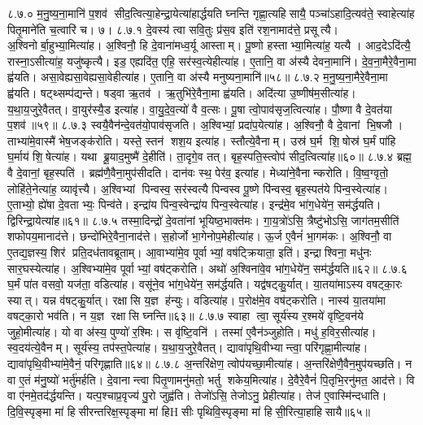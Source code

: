 ८.७.०
म॒नु॒ष्य॒ना॒मानि॑ प॒शव॑ सीद॒त्वित्या॒हेन्द्रा॒येत्या॑हार्द्धयति घ्नन्ति गृह्णा॒त्यहिसायै॒ पञ्चा॑ऽहादि॒त्यव॑ते॒ स्वाहेत्या॑ह पितृ॒माने॑ति च॒त्वारि॑ च। ७।
८.७.१
दे॒वस्य॑ त्वा सवि॒तुः प्र॑स॒व इति॑ रश॒नामाद॑त्ते॒ प्रसूत्यै। अ॒श्विनोर्बा॒हुभ्या॒मित्या॑ह। अ॒श्विनौ॒ हि दे॒वाना॑मध्व॒र्यू आस्ताम्। पू॒ष्णो हस्ताभ्या॒मित्या॑ह॒ यत्यै। आद॒देऽदि॑त्यै॒ रास्ना॒ऽसीत्या॑ह॒ यजु॑ष्कृत्यै। इड॒ एह्यदि॑त॒ एहि॒ सर॑स्व॒त्येहीत्या॑ह। ए॒तानि॒ वा अ॑स्यै देवना॒मानि॑। दे॒व॒ना॒मैरे॒वैना॒मा ह्व॑यति। असा॒वेह्यसा॒वेह्यसा॒वेहीत्या॑ह। ए॒तानि॒ वा अ॑स्यै मनुष्यना॒मानि॑॥५८॥
८.७.२
म॒नु॒ष्य॒ना॒मैरे॒वैना॒मा ह्व॑यति। षट्थ्सम्प॑द्यन्ते। षड्वा ऋ॒तव॑। ऋ॒तुभि॑रे॒वैना॒मा ह्व॑यति। अदि॑त्या उ॒ष्णीष॑म॒सीत्या॑ह। य॒था॒य॒जुरे॒वैतत्। वा॒युर॑स्यै॒ड इत्या॑ह। वा॒यु॒दे॒व॒त्यो॑ वै व॒त्सः। पू॒षा त्वो॒पाव॑सृज॒त्वित्या॑ह। पौ॒ष्णा वै दे॒वत॑या प॒शव॑॥५९॥
८.७.३
स्वयै॒वैन॑न्दे॒वत॑यो॒पाव॑सृजति। अ॒श्विभ्यां॒ प्रदा॑प॒येत्या॑ह। अ॒श्विनौ॒ वै दे॒वानां भि॒षजौ। ताभ्या॑मे॒वास्मै॑ भेष॒जङ्क॑रोति। यस्ते॒ स्तन॑ शश॒य इत्या॑ह। स्तौत्ये॒वैनाम्। उस्र॑ घ॒र्म शि॒षोस्र॑ घ॒र्मं पा॑हि घ॒र्माय॑ शि॒षेत्या॑ह। यथा ब्रू॒याद॒मुष्मै॑ दे॒हीति॑। ता॒दृगे॒व तत्। बृह॒स्पति॒स्त्वोप॑ सीद॒त्वित्या॑ह॥६०॥
८.७.४
ब्रह्म॒ वै दे॒वानां॒ बृह॒स्पति॑। ब्रह्म॑णै॒वैना॒मुप॑सीदति। दान॑वः स्थ॒ पेर॑व॒ इत्या॑ह। मेध्या॑ने॒वैनान्करोति। वि॒ष्व॒ग्वृतो॒ लोहि॑ते॒नेत्या॑ह॒ व्यावृ॑त्त्यै। अ॒श्विभ्यां पिन्वस्व॒ सर॑स्वत्यै पिन्वस्व पू॒ष्णे पि॑न्वस्व॒ बृह॒स्पत॑ये पिन्व॒स्वेत्या॑ह। ए॒ताभ्यो॒ ह्ये॑षा दे॒वताभ्यः॒ पिन्व॑ते। इन्द्रा॑य पिन्व॒स्वेन्द्रा॑य पिन्व॒स्वेत्या॑ह। इन्द्र॑मे॒व भा॑ग॒धेये॑न॒ सम॑र्द्धयति। द्विरिन्द्रा॒येत्या॑ह॥६१॥
८.७.५
तस्मा॒दिन्द्रो॑ दे॒वता॑नां भूयिष्ठ॒भाक्त॑मः। गा॒य॒त्रो॑ऽसि॒ त्रैष्टु॑भोऽसि॒ जाग॑तम॒सीति॑ शफोपय॒मानाद॑त्ते। छन्दो॑भिरे॒वैना॒नाद॑त्ते। स॒होर्जो भा॒गेनोप॒मेहीत्या॑ह। ऊ॒र्ज ए॒वैनं॑ भा॒गम॑कः। अ॒श्विनौ॒ वा ए॒तद्य॒ज्ञस्य॒ शिर॑ प्रति॒दध॑तावब्रूताम्। आ॒वाभ्या॑मे॒व पूर्वाभ्यां॒ वष॑ट्क्रियाता॒ इति॑। इन्द्राश्विना॒ मधु॑नः सार॒घस्येत्या॑ह। अ॒श्विभ्या॑मे॒व पूर्वाभ्यां॒ वष॑ट्करोति। अथो॑ अ॒श्विना॑वे॒व भा॑ग॒धेये॑न॒ सम॑र्द्धयति॥६२॥
८.७.६
घ॒र्मं पा॑त वसवो॒ यज॑ता॒ वडित्या॑ह। वसू॑ने॒व भा॑ग॒धेये॑न॒ सम॑र्द्धयति। यद्व॑षट्कु॒र्यात्। या॒तया॑माऽस्य वषट्का॒रः स्यात्। यन्न व॑षट्कु॒र्यात्। रक्षासि य॒ज्ञ ह॑न्युः। वडित्या॑ह। प॒रोक्ष॑मे॒व वष॑ट्करोति। नास्य॑ या॒तया॑मा वषट्का॒रो भव॑ति। न य॒ज्ञ रक्षासि घ्नन्ति॥६३॥
८.७.७
स्वाहा त्वा॒ सूर्य॑स्य र॒श्मये॑ वृष्टि॒वन॑ये जुहो॒मीत्या॑ह। यो वा अ॑स्य॒ पुण्यो॑ र॒श्मिः। स वृ॑ष्टि॒वनि॑। तस्मा॑ ए॒वैन॑ञ्जुहोति। मधु॑ ह॒विर॒सीत्या॑ह। स्व॒दय॑त्ये॒वैनम्। सूर्य॑स्य॒ तप॑स्त॒पेत्या॑ह। य॒था॒य॒जुरे॒वैतत्। द्यावा॑पृथि॒वीभ्यान्त्वा॒ परि॑गृह्णा॒मीत्या॑ह। द्यावा॑पृथि॒वीभ्या॑मे॒वैनं॒ परि॑गृह्णाति॥६४॥
८.७.८
अ॒न्तरि॑क्षेण॒ त्वोप॑यच्छा॒मीत्या॑ह। अ॒न्तरि॑क्षेणै॒वैन॒मुप॑यच्छति। न वा ए॒तं म॑नु॒ष्यो॑ भर्तु॑मर्\mbox{}हति। दे॒वानान्त्वा पितृ॒णामनु॑मतो॒ भर्तु शकेय॒मित्या॑ह। दे॒वैरे॒वैनं॑ पि॒तृभि॒रनु॑मत॒ आद॑त्ते। वि वा ए॑नमे॒तद॑र्द्धयन्ति। यत्प॒श्चाप्र॒वृज्य॑ पु॒रो जुह्व॑ति। तेजो॑ऽसि॒ तेजोऽनु॒ प्रेहीत्या॑ह। तेज॑ ए॒वास्मि॑न्दधाति। दि॒वि॒स्पृङ्मा मा॑ हिसीरन्तरिक्ष॒स्पृङ्मा मा॑ हिHसीः पृथिवि॒स्पृङ्मा मा॑ हिसी॒रित्या॒हाहिसायै॥६५॥

